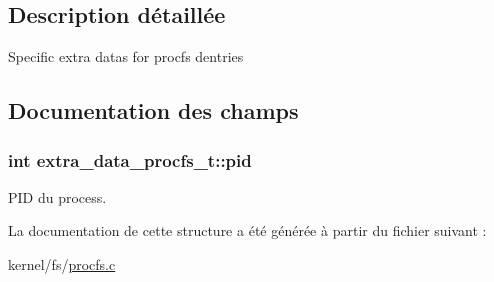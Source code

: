 \subsection{Description détaillée}
Specific extra datas for procfs dentries 

\subsection{Documentation des champs}
\hypertarget{structextra__data__procfs__t_ad501deb466cabf589b4617eac9bcce30}{
\subsubsection[{pid}]{\setlength{\rightskip}{0pt plus 5cm}int extra\+\_\+data\+\_\+procfs\+\_\+t\+::pid}}\label{structextra__data__procfs__t_ad501deb466cabf589b4617eac9bcce30}
P\+I\+D du process. 

La documentation de cette structure a été générée à partir du fichier suivant \+:\begin{DoxyCompactItemize}
\item 
kernel/fs/\hyperlink{procfs_8c}{procfs.\+c}\end{DoxyCompactItemize}
